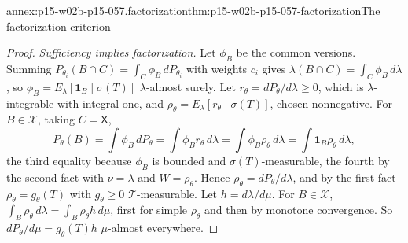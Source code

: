 \begin{annexitem}{annex:p15-w02b-p15-057.factorization}{thm:p15-w02b-p15-057-factorization}{The factorization criterion}
\begin{proof}
\emph{Sufficiency implies factorization.} Let \(\phi_B\) be the common
versions. Summing \(P_{\theta_i}(B\cap C)=\int_C\phi_B\,dP_{\theta_i}\)
with weights \(c_i\) gives \(\lambda(B\cap C)=\int_C\phi_B\,d\lambda\), so
\(\phi_B=E_\lambda[\mathbf1_B\mid\sigma(T)]\) \(\lambda\)-almost surely.
Let \(r_\theta=dP_\theta/d\lambda\geq0\), which is \(\lambda\)-integrable
with integral one, and \(\rho_\theta=E_\lambda[r_\theta\mid\sigma(T)]\),
chosen nonnegative. For \(B\in\mathscr X\), taking \(C=\mathsf X\),
\[
 P_\theta(B)=\int\phi_B\,dP_\theta=\int\phi_Br_\theta\,d\lambda
 =\int\phi_B\rho_\theta\,d\lambda=\int\mathbf1_B\rho_\theta\,d\lambda,
\]
the third equality because \(\phi_B\) is bounded and
\(\sigma(T)\)-measurable, the fourth by the second fact with
\(\nu=\lambda\) and \(W=\rho_\theta\). Hence
\(\rho_\theta=dP_\theta/d\lambda\), and by the first fact
\(\rho_\theta=g_\theta(T)\) with \(g_\theta\geq0\)
\(\mathscr T\)-measurable. Let \(h=d\lambda/d\mu\). For
\(B\in\mathscr X\), \(\int_B\rho_\theta\,d\lambda=\int_B\rho_\theta h\,d\mu\),
first for simple \(\rho_\theta\) and then by monotone convergence. So
\(dP_\theta/d\mu=g_\theta(T)h\) \(\mu\)-almost everywhere.
\end{proof}
\end{annexitem}

